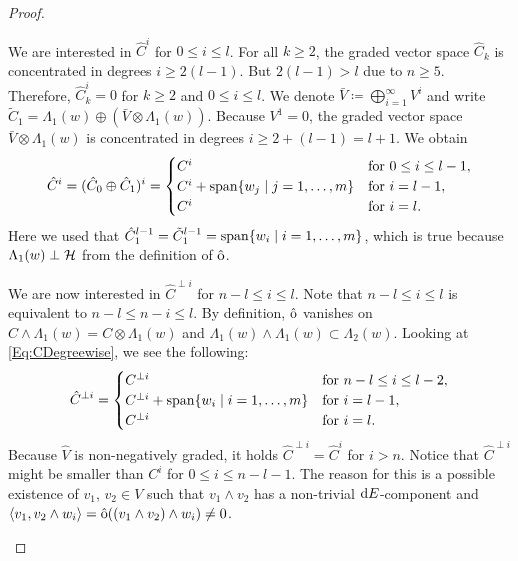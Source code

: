 \documentclass[\MainFolder/Text.tex]{subfiles}
\begin{document}
\begin{proof}
\begin{description}[leftmargin=0pt,font=\normalfont\itshape]
\item[Degreewise description of $\hat{C}$ and $\hat{C}^\perp$:]
We are interested in $\hat{C}^i$ for $0\le i\le l$.
For all $k\ge 2$, the graded vector space $\hat{C}_k$ is concentrated in degrees $i\ge 2(l-1)$.
But $2(l-1)>l$ due to $n\ge 5$.
Therefore, $\hat{C}_k^i = 0$ for $k\ge 2$ and $0\le i \le l$.
We denote $\bar{V} \coloneqq \bigoplus_{i=1}^\infty V^i$ and write $\tilde{C}_1 = \Lambda_1(w) \oplus (\bar{V}\otimes \Lambda_1(w))$.
Because $V^1=0$, the graded vector space $\bar{V}\otimes\Lambda_1(w)$ is concentrated in degrees $i\ge 2 + (l-1) = l + 1$. We obtain  
\begin{equation}\label{Eq:CDegreewise}
\hat{C}^i = (\hat{C}_0 \oplus \hat{C}_1)^i =
 \begin{cases}
 	C^i & \text{for }0 \le i \le l-1, \\
	C^i + \mathrm{span}\{ w_j \mid j = 1, \dotsc, m\} & \text{for }i = l - 1, \\
	C^i & \text{for }i = l.
 \end{cases}
\end{equation}
Here we used that $\hat{C}_1^{l-1} = \tilde{C}_1^{l-1} = \mathrm{span}\{ w_i \mid i = 1, \dotsc, m\}$, which is true because $\Lambda_1(w)\perp\mathcal{H}$ from the definition of $\hat{\mathrm{o}}$.

We are now interested in $\hat{C}^{\perp i}$ for $n-l\le i \le l$.
Note that $n-l \le i \le l$ is equivalent to $n-l \le n-i \le l$.
By definition, $\hat{\mathrm{o}}$ vanishes on $C\wedge\Lambda_1(w)=C\otimes\Lambda_1(w)$ and $\Lambda_1(w)\wedge\Lambda_1(w) \subset \Lambda_2(w)$.
Looking at \eqref{Eq:CDegreewise}, we see the following: 
\begin{equation}\label{Eq:CPerpDegreewise}
	\hat{C}^{\perp i} =
		\begin{cases}
			C^{\perp i} &  \text{for }n-l \le i \le l - 2, \\
			C^{\perp i} + \mathrm{span}\{w_i\mid i=1,\dotsc,m\} & \text{for }i = l-1, \\
			C^{\perp i} & \text{for }i = l.
		\end{cases}		
\end{equation}
Because $\hat{V}$ is non-negatively graded, it holds $\hat{C}^{\perp i} = \hat{C}^i$ for $i>n$.
Notice that $\hat{C}^{\perp i}$ might be smaller than $C^i$ for $0\le i \le n-l-1$.
The reason for this is a possible existence of $v_1$, $v_2\in V$ such that $v_1 \wedge v_2$ has a non-trivial $\mathrm{d} E$-component and $\langle v_1, v_2\wedge w_i \rangle = \hat{\mathrm{o}}((v_1\wedge v_2)\wedge w_i) \neq 0$.


\end{description}
\end{proof}
\end{document}
